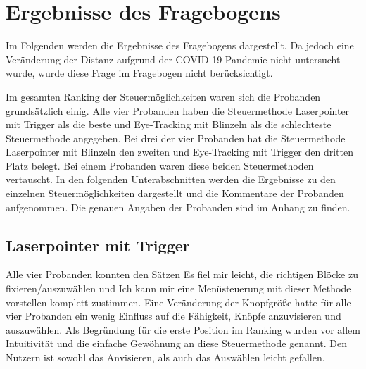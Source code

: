 \section{Ergebnisse des Fragebogens}
Im Folgenden werden die Ergebnisse des Fragebogens dargestellt. Da jedoch eine Veränderung der Distanz aufgrund der COVID-19-Pandemie nicht untersucht wurde, wurde diese Frage im Fragebogen nicht berücksichtigt. 

Im gesamten Ranking der Steuermöglichkeiten waren sich die Probanden grundsätzlich einig. Alle vier Probanden haben die Steuermethode Laserpointer mit Trigger als die beste und Eye-Tracking mit Blinzeln als die schlechteste Steuermethode angegeben. Bei drei der vier Probanden hat die Steuermethode Laserpointer mit Blinzeln den zweiten und Eye-Tracking mit Trigger den dritten Platz belegt. Bei einem Probanden waren diese beiden Steuermethoden vertauscht. In den folgenden Unterabschnitten werden die Ergebnisse zu den einzelnen Steuermöglichkeiten dargestellt und die Kommentare der Probanden aufgenommen. Die genauen Angaben der Probanden sind im Anhang  zu finden.
\subsection{Laserpointer mit Trigger}
Alle vier Probanden konnten den Sätzen \glqq Es fiel mir leicht, die richtigen Blöcke zu fixieren/auszuwählen\grqq{} und \glqq Ich kann mir eine Menüsteuerung mit dieser Methode vorstellen\grqq{} komplett zustimmen. Eine Veränderung der Knopfgröße hatte für alle vier Probanden \glqq ein wenig\grqq{} Einfluss auf die Fähigkeit, Knöpfe anzuvisieren und auszuwählen. Als Begründung für die erste Position im Ranking wurden vor allem Intuitivität und die einfache Gewöhnung an diese Steuermethode genannt. Den Nutzern ist sowohl das Anvisieren, als auch das Auswählen leicht gefallen. 
